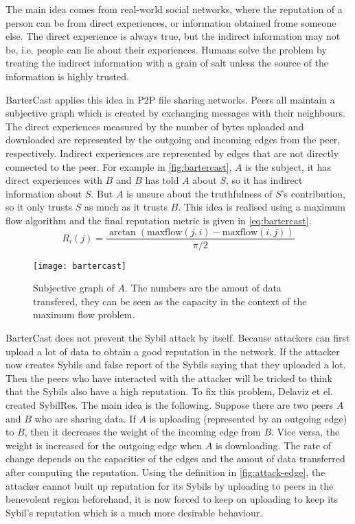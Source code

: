 The main idea comes from real-world social networks, where the reputation of a
person can be from direct experiences, or information obtained frome someone
else. The direct experience is always true, but the indirect information may not
be, i.e. people can lie about their experiences. Humans solve the problem by
treating the indirect information with a grain of salt unless the source of the
information is highly trusted.

BarterCast applies this idea in P2P file sharing networks. Peers all maintain a
subjective graph which is created by exchanging messages with their neighbours.
The direct experiences measured by the number of bytes uploaded and downloaded
are represented by the outgoing and incoming edges from the peer, respectively.
Indirect experiences are represented by edges that are not directly connected to
the peer. For example in \autoref{fig:bartercast}, $A$ is the subject, it has
direct experiences with $B$ and $B$ has told $A$ about $S$, so it has indirect
information about $S$. But $A$ is unsure about the truthfulness of $S$'s
contribution, so it only trusts $S$ as much as it trusts $B$. This idea is
realised using a maximum flow algorithm and the final reputation metric is given
in \autoref{eq:bartercast}.
\begin{equation}\label{eq:bartercast}
  R_i(j) = \frac{\arctan(\text{maxflow}(j, i) - \text{maxflow}(i, j))}{\pi / 2}
\end{equation}

\begin{figure}
  \centering
  \texttt{[image: bartercast]}
  \caption{Subjective graph of $A$. The numbers are the amout of data transfered,
    they can be seen as the capacity in the context of the maximum flow
    problem.}
  \label{fig:bartercast}
\end{figure}

BarterCast does not prevent the Sybil attack by itself. Because attackers can
first upload a lot of data to obtain a good reputation in the network. If the
attacker now creates Sybils and false report of the Sybils saying that they
uploaded a lot. Then the peers who have interacted with the attacker will be
tricked to think that the Sybils also have a high reputation. To fix this
problem, Delaviz et el. created SybilRes\cite{delaviz2012sybilres}. The main
idea is the following. Suppose there are two peers $A$ and $B$ who are sharing
data. If $A$ is uploading (represented by an outgoing edge) to $B$, then it
decreases the weight of the incoming edge from $B$. Vice versa, the weight is
increased for the outgoing edge when $A$ is downloading. The rate of change
depends on the capacities of the edges and the amout of data transferred after
computing the reputation. Using the definition in \autoref{fig:attack-edge}, the
attacker cannot built up reputation for its Sybils by uploading to peers in the
benevolent region beforehand, it is now forced to keep on uploading to keep its
Sybil's reputation which is a much more desirable behaviour.

